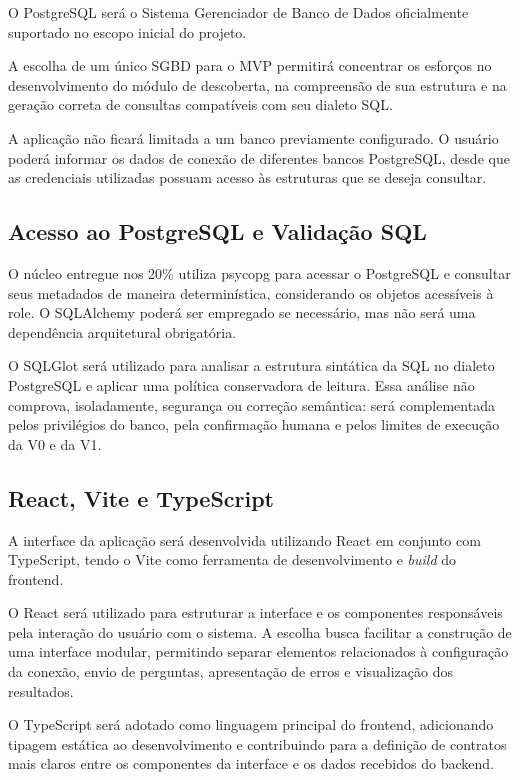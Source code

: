 O PostgreSQL será o Sistema Gerenciador de Banco de Dados oficialmente suportado no escopo inicial do projeto.

A escolha de um único SGBD para o MVP permitirá concentrar os esforços no desenvolvimento do módulo de descoberta, na compreensão de sua estrutura e na geração correta de consultas compatíveis com seu dialeto SQL.

A aplicação não ficará limitada a um banco previamente configurado. O usuário poderá informar os dados de conexão de diferentes bancos PostgreSQL, desde que as credenciais utilizadas possuam acesso às estruturas que se deseja consultar.


\subsection{Acesso ao PostgreSQL e Validação SQL}

O núcleo entregue nos 20\% utiliza psycopg para acessar o PostgreSQL e consultar seus metadados de maneira determinística, considerando os objetos acessíveis à role. O SQLAlchemy poderá ser empregado se necessário, mas não será uma dependência arquitetural obrigatória.

O SQLGlot será utilizado para analisar a estrutura sintática da SQL no dialeto PostgreSQL e aplicar uma política conservadora de leitura. Essa análise não comprova, isoladamente, segurança ou correção semântica: será complementada pelos privilégios do banco, pela confirmação humana e pelos limites de execução da V0 e da V1.


\subsection{React, Vite e TypeScript}

A interface da aplicação será desenvolvida utilizando React em conjunto com TypeScript, tendo o Vite como ferramenta de desenvolvimento e \textit{build} do frontend.

O React será utilizado para estruturar a interface e os componentes responsáveis pela interação do usuário com o sistema. A escolha busca facilitar a construção de uma interface modular, permitindo separar elementos relacionados à configuração da conexão, envio de perguntas, apresentação de erros e visualização dos resultados.

O TypeScript será adotado como linguagem principal do frontend, adicionando tipagem estática ao desenvolvimento e contribuindo para a definição de contratos mais claros entre os componentes da interface e os dados recebidos do backend.

